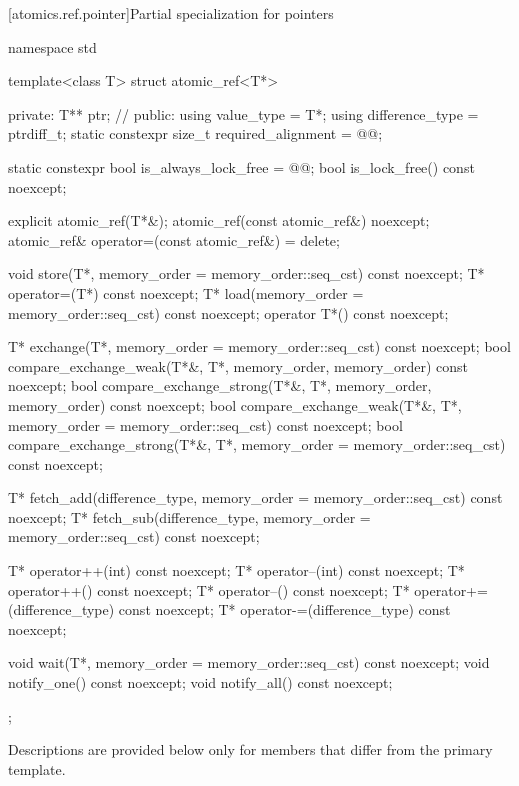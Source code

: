 [atomics.ref.pointer]{Partial specialization for pointers}
%

\begin{codeblock}
namespace std {
  template<class T> struct atomic_ref<T*> {
  private:
    T** ptr;        // \expos
  public:
    using value_type = T*;
    using difference_type = ptrdiff_t;
    static constexpr size_t required_alignment = @@;

    static constexpr bool is_always_lock_free = @@;
    bool is_lock_free() const noexcept;

    explicit atomic_ref(T*&);
    atomic_ref(const atomic_ref&) noexcept;
    atomic_ref& operator=(const atomic_ref&) = delete;

    void store(T*, memory_order = memory_order::seq_cst) const noexcept;
    T* operator=(T*) const noexcept;
    T* load(memory_order = memory_order::seq_cst) const noexcept;
    operator T*() const noexcept;

    T* exchange(T*, memory_order = memory_order::seq_cst) const noexcept;
    bool compare_exchange_weak(T*&, T*,
                               memory_order, memory_order) const noexcept;
    bool compare_exchange_strong(T*&, T*,
                                 memory_order, memory_order) const noexcept;
    bool compare_exchange_weak(T*&, T*,
                               memory_order = memory_order::seq_cst) const noexcept;
    bool compare_exchange_strong(T*&, T*,
                                 memory_order = memory_order::seq_cst) const noexcept;

    T* fetch_add(difference_type, memory_order = memory_order::seq_cst) const noexcept;
    T* fetch_sub(difference_type, memory_order = memory_order::seq_cst) const noexcept;

    T* operator++(int) const noexcept;
    T* operator--(int) const noexcept;
    T* operator++() const noexcept;
    T* operator--() const noexcept;
    T* operator+=(difference_type) const noexcept;
    T* operator-=(difference_type) const noexcept;

    void wait(T*, memory_order = memory_order::seq_cst) const noexcept;
    void notify_one() const noexcept;
    void notify_all() const noexcept;
  };
}
\end{codeblock}

\pnum
Descriptions are provided below only for members
that differ from the primary template.

